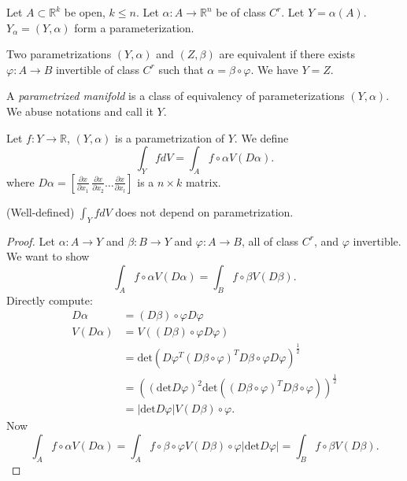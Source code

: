 
\begin{definition}
	Let $A \subset \mathbb{R}^k$ be open, $k \le n$. Let $\alpha: A \to \mathbb{R}^n$ be of class $C^r$. Let $Y = \alpha(A)$. $Y_\alpha = (Y, \alpha)$ form a parameterization.

	Two parametrizations $(Y, \alpha)$ and $(Z, \beta)$ are equivalent if there exists $\varphi: A \to B$ invertible of class $C^r$ such that  $\alpha = \beta \circ \varphi$. We have $Y = Z$.

	A \textit{parametrized manifold} is a class of equivalency of parameterizations $(Y, \alpha)$. We abuse notations and call it $Y$.
\end{definition}

\begin{definition}
	Let $f: Y \to \mathbb{R}$, $(Y, \alpha)$ is a parametrization of $Y$. We define
	\[
		\int _Y f dV = \int _A f \circ \alpha V(D\alpha)
	.\] 
	where $D \alpha = \left[\frac{\partial x}{\partial x_1} \, \frac{\partial x}{\partial x_2} \ldots \frac{\partial x}{\partial x_l} \right]$ is a $n \times k$ matrix.
\end{definition}

\begin{proposition}(Well-defined)
	$\int _Y f dV$ does not depend on parametrization.
\end{proposition}
\begin{proof}
	Let $\alpha: A \to Y$ and $\beta: B \to Y$ and $\varphi: A \to B$, all of class $C^r$, and $\varphi$ invertible. We want to show
	\[
		\int _A f \circ \alpha V(D \alpha) = \int _B f \circ \beta V(D \beta)
	.\] 
	Directly compute:
	\begin{align*}
		D \alpha  &= (D \beta) \circ \varphi D \varphi \\
		V(D \alpha) &= V\left( (D \beta) \circ \varphi D \varphi \right)  \\
		&= \text{det}\left( D \varphi ^T (D \beta \circ \varphi)^T D \beta \circ \varphi D \varphi \right)^{\frac{1}{2}}  \\
		&= \left(( \text{det}D \varphi)^2 \text{det}\left(( D \beta \circ \varphi)^T D \beta \circ \varphi \right)  \right) ^{\frac{1}{2}} \\
		&= \left| \text{det}D\varphi \right| V(D \beta) \circ \varphi
	.\end{align*}
	Now
	\[
		\int _A f \circ \alpha V(D \alpha) = \int _A f \circ \beta \circ \varphi V(D \beta) \circ \varphi |\text{det}D\varphi| = \int _B f \circ \beta V(D \beta)
	.\] 
\end{proof}


